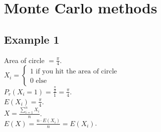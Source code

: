 \documentclass[a4paper, 12pt]{book}
\theoremstyle{definition}
\theoremstyle{remark}
\begin{document}
\section{Monte Carlo methods}

\subsection{Example 1}

Area of circle $= \frac{\pi}{4}$. \\
$X_i = \begin{cases}
  1 \text{ if you hit the area of circle} \\
  0 \text{ else}
\end{cases}$ \\
$P_r(X_i = 1) = \frac{\frac{\pi}{2}}{1} = \frac{\pi}{4}$. \\
$E(X_i) = \frac{\pi}{4}$. \\
$X = \frac{\sum_{i=1}^{n} X_i}{n}$. \\
$E(X) = \frac{n \cdot E(X_i)}{n} = E(X_i)$.



%
%



\end{document}
